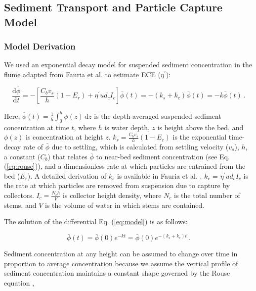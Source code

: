\documentclass[geosciences,article,submit,moreauthors,pdftex]{Definitions/mdpi}
\begin{document}
\subsection{Sediment Transport and Particle Capture Model}

\subsubsection{Model Derivation}

We used an exponential decay model for suspended sediment concentration in the flume adapted from Fauria et al. \cite{Fauria_2015} to estimate ECE ($\eta^\prime$):

\begin{equation}
    \frac{\mathrm{d}\bar{\phi}}{\mathrm{d}t} = -\left[\frac{C_bv_s}{h}(1-E_r) + \eta^{\prime}ud_cI_c\right]\bar{\phi}(t) = -(k_s + k_c)\bar{\phi}(t) = -k\bar{\phi}(t)\,.
    \label{eq:model}    
\end{equation}

\noindent Here, $\bar{\phi}(t) = \frac{1}{h} \int_0^h\phi(z) \,\mathrm{d}z$ is the depth-averaged suspended sediment concentration at time $t$, where $h$ is water depth, $z$ is height above the bed, and $\phi(z)$ is concentration at height $z$. $k_s = \frac{C_bv_s}{h}(1-E_r)$ is the exponential time-decay rate of $\bar{\phi}$ due to settling, which is calculated from settling velocity ($v_s$), $h$, a constant ($C_b$) that relates $\bar{\phi}$ to near-bed sediment concentration (see Eq. (\ref{eq:rouse})), and a dimensionless rate at which particles are entrained from the bed ($E_r$). A detailed derivation of $k_s$ is available in Fauria et al. \cite{Fauria_2015}. $k_c$ = $\eta^{\prime}ud_cI_c$ is the rate at which particles are removed from suspension due to capture by collectors. $I_c = \frac{N_ch}{V}$ is collector height density, where $N_c$ is the total number of stems, and $V$ is the volume of water in which stems are contained.

The solution of the differential Eq. (\ref{eq:model}) is as follows:

\begin{equation}
    \bar{\phi}(t) = \bar{\phi}(0)e^{-kt} = \bar{\phi}(0)e^{-(k_s + k_c)t}\,.
    \label{eq:expo}    
\end{equation}

\noindent Sediment concentration at any height can be assumed to change over time in proportion to average concentration because we assume the vertical profile of sediment concentration maintains a constant shape governed by the Rouse equation \cite{rouse1937modern, kumbhakar2017derivation},
\end{document}
